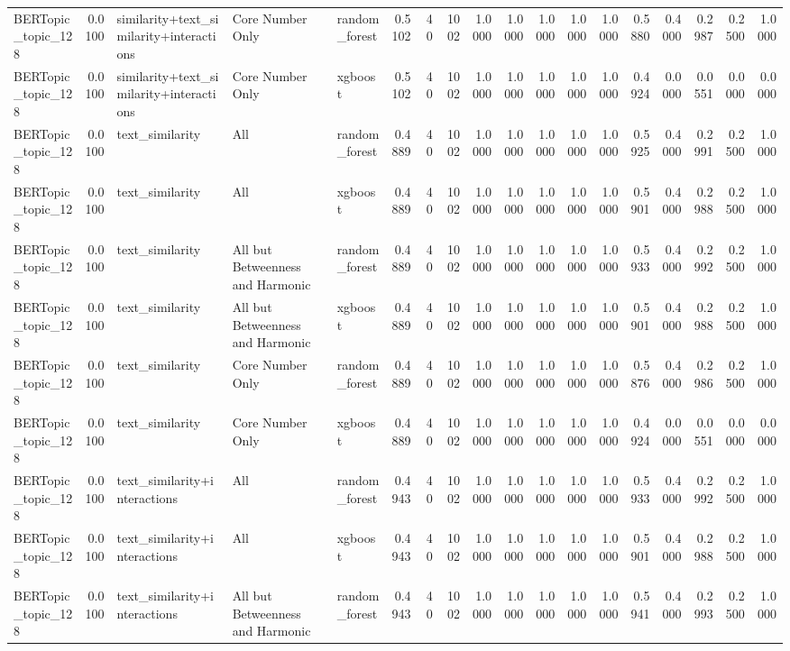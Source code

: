 \begin{tabular}{lrlllrrrrrrrrrrrrr}
BERTopic_topic_128 & 0.0100 & similarity+text_similarity+interactions & Core Number Only & random_forest & 0.5102 & 40 & 1002 & 1.0000 & 1.0000 & 1.0000 & 1.0000 & 1.0000 & 0.5880 & 0.4000 & 0.2987 & 0.2500 & 1.0000 \\
BERTopic_topic_128 & 0.0100 & similarity+text_similarity+interactions & Core Number Only & xgboost & 0.5102 & 40 & 1002 & 1.0000 & 1.0000 & 1.0000 & 1.0000 & 1.0000 & 0.4924 & 0.0000 & 0.0551 & 0.0000 & 0.0000 \\
BERTopic_topic_128 & 0.0100 & text_similarity & All & random_forest & 0.4889 & 40 & 1002 & 1.0000 & 1.0000 & 1.0000 & 1.0000 & 1.0000 & 0.5925 & 0.4000 & 0.2991 & 0.2500 & 1.0000 \\
BERTopic_topic_128 & 0.0100 & text_similarity & All & xgboost & 0.4889 & 40 & 1002 & 1.0000 & 1.0000 & 1.0000 & 1.0000 & 1.0000 & 0.5901 & 0.4000 & 0.2988 & 0.2500 & 1.0000 \\
BERTopic_topic_128 & 0.0100 & text_similarity & All but Betweenness and Harmonic & random_forest & 0.4889 & 40 & 1002 & 1.0000 & 1.0000 & 1.0000 & 1.0000 & 1.0000 & 0.5933 & 0.4000 & 0.2992 & 0.2500 & 1.0000 \\
BERTopic_topic_128 & 0.0100 & text_similarity & All but Betweenness and Harmonic & xgboost & 0.4889 & 40 & 1002 & 1.0000 & 1.0000 & 1.0000 & 1.0000 & 1.0000 & 0.5901 & 0.4000 & 0.2988 & 0.2500 & 1.0000 \\
BERTopic_topic_128 & 0.0100 & text_similarity & Core Number Only & random_forest & 0.4889 & 40 & 1002 & 1.0000 & 1.0000 & 1.0000 & 1.0000 & 1.0000 & 0.5876 & 0.4000 & 0.2986 & 0.2500 & 1.0000 \\
BERTopic_topic_128 & 0.0100 & text_similarity & Core Number Only & xgboost & 0.4889 & 40 & 1002 & 1.0000 & 1.0000 & 1.0000 & 1.0000 & 1.0000 & 0.4924 & 0.0000 & 0.0551 & 0.0000 & 0.0000 \\
BERTopic_topic_128 & 0.0100 & text_similarity+interactions & All & random_forest & 0.4943 & 40 & 1002 & 1.0000 & 1.0000 & 1.0000 & 1.0000 & 1.0000 & 0.5933 & 0.4000 & 0.2992 & 0.2500 & 1.0000 \\
BERTopic_topic_128 & 0.0100 & text_similarity+interactions & All & xgboost & 0.4943 & 40 & 1002 & 1.0000 & 1.0000 & 1.0000 & 1.0000 & 1.0000 & 0.5901 & 0.4000 & 0.2988 & 0.2500 & 1.0000 \\
BERTopic_topic_128 & 0.0100 & text_similarity+interactions & All but Betweenness and Harmonic & random_forest & 0.4943 & 40 & 1002 & 1.0000 & 1.0000 & 1.0000 & 1.0000 & 1.0000 & 0.5941 & 0.4000 & 0.2993 & 0.2500 & 1.0000 \\

\end{tabular}
